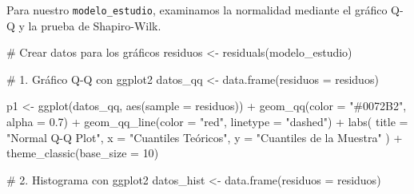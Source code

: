 \documentclass[
  letterpaper,
  DIV=11,
  numbers=noendperiod]{scrreprt}
\newenvironment{Shaded}{\begin{snugshade}}{\end{snugshade}}
\newcommand{\AttributeTok}[1]{\textcolor[rgb]{0.40,0.45,0.13}{#1}}
\newcommand{\CommentTok}[1]{\textcolor[rgb]{0.37,0.37,0.37}{#1}}
\newcommand{\DecValTok}[1]{\textcolor[rgb]{0.68,0.00,0.00}{#1}}
\newcommand{\FloatTok}[1]{\textcolor[rgb]{0.68,0.00,0.00}{#1}}
\newcommand{\FunctionTok}[1]{\textcolor[rgb]{0.28,0.35,0.67}{#1}}
\newcommand{\NormalTok}[1]{\textcolor[rgb]{0.00,0.23,0.31}{#1}}
\newcommand{\OtherTok}[1]{\textcolor[rgb]{0.00,0.23,0.31}{#1}}
\newcommand{\SpecialCharTok}[1]{\textcolor[rgb]{0.37,0.37,0.37}{#1}}
\newcommand{\StringTok}[1]{\textcolor[rgb]{0.13,0.47,0.30}{#1}}
\begin{document}
\begin{tcolorbox}[enhanced jigsaw, leftrule=.75mm, breakable, colbacktitle=quarto-callout-tip-color!10!white, bottomrule=.15mm, colframe=quarto-callout-tip-color-frame, toprule=.15mm, colback=white, coltitle=black, bottomtitle=1mm, left=2mm, title=\textcolor{quarto-callout-tip-color}{\faLightbulb}\hspace{0.5em}{Ejemplo de normalidad válida}, opacityback=0, arc=.35mm, opacitybacktitle=0.6, toptitle=1mm, titlerule=0mm, rightrule=.15mm]

Para nuestro \texttt{modelo\_estudio}, examinamos la normalidad mediante
el gráfico Q-Q y la prueba de Shapiro-Wilk.

\begin{Shaded}
\begin{Highlighting}[]
\CommentTok{\# Crear datos para los gráficos}
\NormalTok{residuos }\OtherTok{\textless{}{-}} \FunctionTok{residuals}\NormalTok{(modelo\_estudio)}

\CommentTok{\# 1. Gráfico Q{-}Q con ggplot2}
\NormalTok{datos\_qq }\OtherTok{\textless{}{-}} \FunctionTok{data.frame}\NormalTok{(}\AttributeTok{residuos =}\NormalTok{ residuos)}

\NormalTok{p1 }\OtherTok{\textless{}{-}} \FunctionTok{ggplot}\NormalTok{(datos\_qq, }\FunctionTok{aes}\NormalTok{(}\AttributeTok{sample =}\NormalTok{ residuos)) }\SpecialCharTok{+}
  \FunctionTok{geom\_qq}\NormalTok{(}\AttributeTok{color =} \StringTok{"\#0072B2"}\NormalTok{, }\AttributeTok{alpha =} \FloatTok{0.7}\NormalTok{) }\SpecialCharTok{+}
  \FunctionTok{geom\_qq\_line}\NormalTok{(}\AttributeTok{color =} \StringTok{"red"}\NormalTok{, }\AttributeTok{linetype =} \StringTok{"dashed"}\NormalTok{) }\SpecialCharTok{+}
  \FunctionTok{labs}\NormalTok{(}
    \AttributeTok{title =} \StringTok{"Normal Q{-}Q Plot"}\NormalTok{,}
    \AttributeTok{x =} \StringTok{"Cuantiles Teóricos"}\NormalTok{,}
    \AttributeTok{y =} \StringTok{"Cuantiles de la Muestra"}
\NormalTok{  ) }\SpecialCharTok{+}
  \FunctionTok{theme\_classic}\NormalTok{(}\AttributeTok{base\_size =} \DecValTok{10}\NormalTok{)}

\CommentTok{\# 2. Histograma con ggplot2}
\NormalTok{datos\_hist }\OtherTok{\textless{}{-}} \FunctionTok{data.frame}\NormalTok{(}\AttributeTok{residuos =}\NormalTok{ residuos)}


\end{Highlighting}
\end{Shaded}
\end{tcolorbox}
\end{document}
